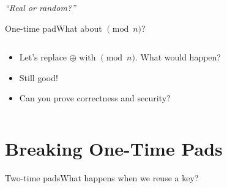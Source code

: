 \documentclass[aspectratio=169, lualatex, handout]{beamer}
\begin{document}
\begin{frame}
	\begin{center}
		\huge \textit{``Real or random?''}
	\end{center}
\end{frame}

\begin{frame}{One-time pad}{What about $\pmod{n}$?}
	\begin{columns}[c]
		\begin{column}{0.5\textwidth}
			\begin{itemize}[<+->]
				\item Let's replace $\oplus$ with $\pmod{n}$. What would happen?
				\item Still good!
				\item Can you prove correctness and security?
			\end{itemize}
		\end{column}
		\begin{column}{0.5\textwidth}
		\end{column}
	\end{columns}
\end{frame}

\section{Breaking One-Time Pads}

\begin{frame}{Two-time pads}{What happens when we reuse a key?}
	\begin{columns}[c]
	\end{columns}
\end{frame}
\end{document}
